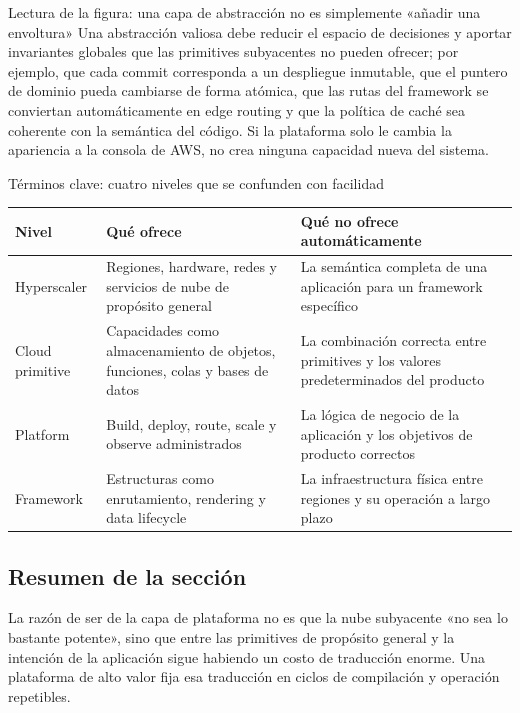 
\begin{knowledgebox}{Lectura de la figura: una capa de abstracción no es simplemente «añadir una envoltura»}
Una abstracción valiosa debe reducir el espacio de decisiones y aportar invariantes globales que las primitives subyacentes no pueden ofrecer; por ejemplo, que cada commit corresponda a un despliegue inmutable, que el puntero de dominio pueda cambiarse de forma atómica, que las rutas del framework se conviertan automáticamente en edge routing y que la política de caché sea coherente con la semántica del código. Si la plataforma solo le cambia la apariencia a la consola de AWS, no crea ninguna capacidad nueva del sistema.
\end{knowledgebox}

\begin{knowledgebox}{Términos clave: cuatro niveles que se confunden con facilidad}
\begin{tabularx}{\textwidth}{L{0.20\textwidth}>{\raggedright\arraybackslash}X>{\raggedright\arraybackslash}X}
\toprule
Nivel & Qué ofrece & Qué no ofrece automáticamente \\
\midrule
Hyperscaler & Regiones, hardware, redes y servicios de nube de propósito general & La semántica completa de una aplicación para un framework específico \\
Cloud primitive & Capacidades como almacenamiento de objetos, funciones, colas y bases de datos & La combinación correcta entre primitives y los valores predeterminados del producto \\
Platform & Build, deploy, route, scale y observe administrados & La lógica de negocio de la aplicación y los objetivos de producto correctos \\
Framework & Estructuras como enrutamiento, rendering y data lifecycle & La infraestructura física entre regiones y su operación a largo plazo \\
\bottomrule
\end{tabularx}
\end{knowledgebox}

\subsection{Resumen de la sección}

La razón de ser de la capa de plataforma no es que la nube subyacente «no sea lo bastante potente», sino que entre las primitives de propósito general y la intención de la aplicación sigue habiendo un costo de traducción enorme. Una plataforma de alto valor fija esa traducción en ciclos de compilación y operación repetibles.
